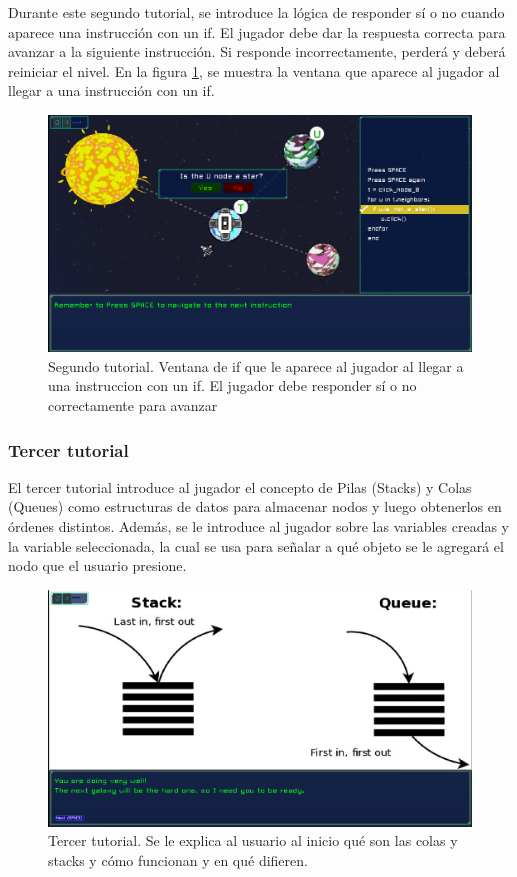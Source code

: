 Durante este segundo tutorial, se introduce la lógica de responder sí o no cuando aparece una instrucción con un if. El jugador debe dar la respuesta correcta para avanzar a la siguiente instrucción. Si responde incorrectamente, perderá y deberá reiniciar el nivel. En la figura \ref{SecondTutorialShowingIf}, se muestra la ventana que aparece al jugador al llegar a una instrucción con un if.

\begin{figure}[h]
	\centering
	\includegraphics[scale=0.3]{imagenes/SecondTutorialShowingIf.png}
	\caption{Segundo tutorial. Ventana de if que le aparece al jugador al llegar a una instruccion con un if. El jugador debe responder sí o no correctamente para avanzar}
	\label{SecondTutorialShowingIf}
\end{figure}

\subsubsection{Tercer tutorial}

El tercer tutorial introduce al jugador el concepto de Pilas (Stacks) y Colas (Queues) como estructuras de datos para almacenar nodos y luego obtenerlos en órdenes distintos. Además, se le introduce al jugador sobre las variables creadas y la variable seleccionada, la cual se usa para señalar a qué objeto se le agregará el nodo que el usuario presione.

\begin{figure}[h]
	\centering
	\includegraphics[scale=0.3]{imagenes/ThirdTutorialFirstDialogue.png}
	\caption{Tercer tutorial. Se le explica al usuario al inicio qué son las colas y stacks y cómo funcionan y en qué difieren.}
	\label{ThirdTutorialFirstDialogue}
\end{figure}


